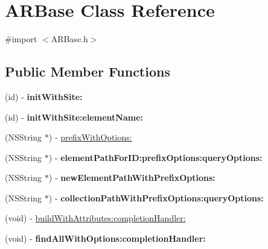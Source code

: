 \hypertarget{a00001}{
\section{\-A\-R\-Base \-Class \-Reference}
\label{a00001}
}


{\ttfamily \#import $<$\-A\-R\-Base.\-h$>$}

\subsection*{\-Public \-Member \-Functions}
\begin{DoxyCompactItemize}
\item 
\hypertarget{a00001_a73d373f564efe4638e3e32ce597e4f9a}{
(id) -\/ {\bfseries init\-With\-Site\-:}}
\label{a00001_a73d373f564efe4638e3e32ce597e4f9a}

\item 
\hypertarget{a00001_a4b502f26de7219184c4c2c5c97a6643a}{
(id) -\/ {\bfseries init\-With\-Site\-:element\-Name\-:}}
\label{a00001_a4b502f26de7219184c4c2c5c97a6643a}

\item 
(\-N\-S\-String $\ast$) -\/ \hyperlink{a00001_a927a21ede543031d0bdbbc9c4c334a95}{prefix\-With\-Options\-:}
\item 
\hypertarget{a00001_a979b630979926df19866ec1e081a6f2f}{
(\-N\-S\-String $\ast$) -\/ {\bfseries element\-Path\-For\-I\-D\-:prefix\-Options\-:query\-Options\-:}}
\label{a00001_a979b630979926df19866ec1e081a6f2f}

\item 
\hypertarget{a00001_a9bf809bd99b8b142b87c66f8d56224a3}{
(\-N\-S\-String $\ast$) -\/ {\bfseries new\-Element\-Path\-With\-Prefix\-Options\-:}}
\label{a00001_a9bf809bd99b8b142b87c66f8d56224a3}

\item 
\hypertarget{a00001_a1ee9032aa114bb273e86220be27a9c40}{
(\-N\-S\-String $\ast$) -\/ {\bfseries collection\-Path\-With\-Prefix\-Options\-:query\-Options\-:}}
\label{a00001_a1ee9032aa114bb273e86220be27a9c40}

\item 
(void) -\/ \hyperlink{a00001_a8bc6aca5de5b209bf470d6daf0850443}{build\-With\-Attributes\-:completion\-Handler\-:}
\item 
\hypertarget{a00001_a0e575ff1338cfd465deb9173a303a3b2}{
(void) -\/ {\bfseries find\-All\-With\-Options\-:completion\-Handler\-:}}
\label{a00001_a0e575ff1338cfd465deb9173a303a3b2}


\end{DoxyCompactItemize}
